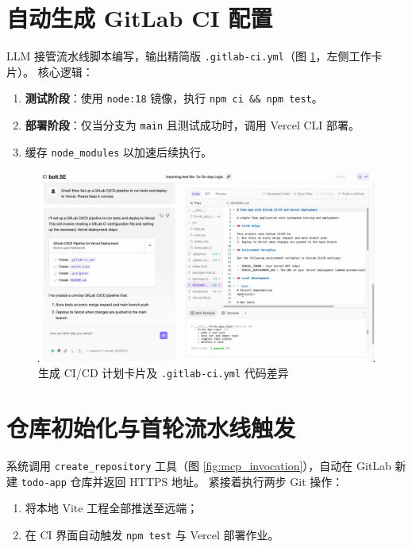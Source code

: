 \section{自动生成 GitLab CI 配置}
\label{sec:cicd-ci-yml}

LLM 接管流水线脚本编写，输出精简版 \texttt{.gitlab-ci.yml}（图 \ref{fig:ci_plan}，左侧工作卡片）。  
核心逻辑：

\begin{enumerate}
  \item \textbf{测试阶段}：使用 \texttt{node:18} 镜像，执行 \texttt{npm ci \&\& npm test}。  
  \item \textbf{部署阶段}：仅当分支为 \texttt{main} 且测试成功时，调用 Vercel CLI 部署。  
  \item 缓存 \texttt{node\_modules} 以加速后续执行。  
\end{enumerate}

\begin{figure}[htbp]
  \centering
  \includegraphics[width=.8\textwidth]{figures/screenshots/ci-cd/ci_plan.png}
  \caption{生成 CI/CD 计划卡片及 \texttt{.gitlab-ci.yml} 代码差异}
  \label{fig:ci_plan}
\end{figure}

\section{仓库初始化与首轮流水线触发}

系统调用 \texttt{create\_repository} 工具（图 \ref{fig:mcp_invocation}），自动在 GitLab 新建 \texttt{todo-app} 仓库并返回 HTTPS 地址。  
紧接着执行两步 Git 操作：

\begin{enumerate}
  \item 将本地 Vite 工程全部推送至远端；  
  \item 在 CI 界面自动触发 \texttt{npm test} 与 Vercel 部署作业。  
\end{enumerate}

